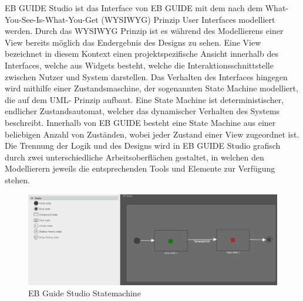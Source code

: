 EB GUIDE Studio ist das Interface von EB GUIDE mit dem nach dem What-You-See-Is-What-You-Get (WYSIWYG) Prinzip User Interfaces modelliert werden. 
Durch das WYSIWYG Prinzip ist es während des Modellierens einer View bereits möglich das Endergebnis des Designs zu sehen.
Eine View bezeichnet in diesem Kontext einen projektspezifische Ansicht innerhalb des Interfaces, welche aus Widgets besteht, welche die Interaktionsschnittstelle zwischen Nutzer und System darstellen.
Das Verhalten des Interfaces hingegen wird mithilfe einer Zustandsmaschine, der sogenannten State Machine modelliert, die auf dem UML- Prinzip aufbaut.
Eine State Machine ist deterministischer, endlicher Zustandsautomat, welcher das dynamischer Verhalten des Systems beschreibt.
Innerhalb von EB GUIDE besteht eine State Machine aus einer beliebigen Anzahl von Zuständen, wobei jeder Zustand einer View zugeordnet ist.
Die Trennung der Logik und des Designs wird in EB GUIDE Studio grafisch durch zwei unterschiedliche Arbeitsoberflächen gestaltet, in welchen den Modellierern jeweils die entsprechenden Tools und Elemente zur Verfügung stehen.

\begin{figure} [H]
\begin{center}
  \includegraphics[scale=0.4]{figures/Guide_Statemachine.PNG}
  \caption{EB Guide Studio Statemachine}
  \label{fig:Guide_Statemachine}
\end{center}
\end{figure}

